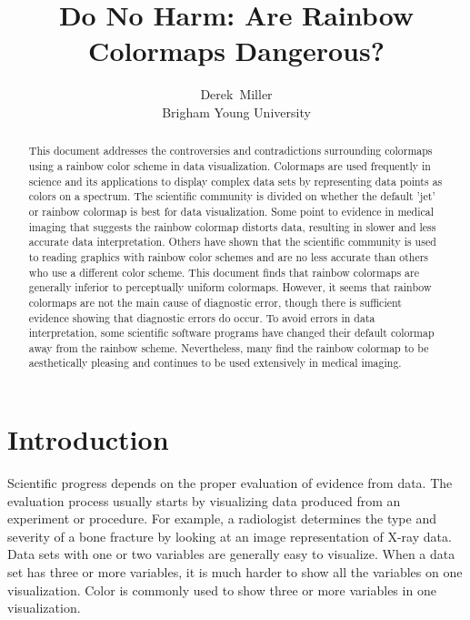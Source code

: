 \documentclass[journal,12pt]{IEEEtran}
\title{Do No Harm: Are Rainbow Colormaps Dangerous? \\}
\author{Derek~Miller \\ Brigham Young University}%
\begin{document}
\begin{titlepage}
\maketitle
\thispagestyle{empty}

\begin{abstract}
This document addresses the controversies and contradictions
surrounding colormaps using a rainbow color scheme in data visualization.
Colormaps are used frequently in science and its applications
to display complex data sets by
representing data points as colors on a spectrum. The scientific
community is divided on whether the default 'jet' or rainbow colormap
is best for data visualization. Some point to evidence in medical imaging
that suggests the rainbow colormap distorts data, resulting in slower and 
less accurate data interpretation. Others have shown that the
scientific community is used to reading graphics with rainbow
color schemes and are no less accurate than others who use
a different color scheme. This document finds that rainbow colormaps
are generally inferior to perceptually uniform colormaps. However, it
seems that rainbow colormaps are not the main cause of diagnostic error,
though there is sufficient evidence showing that diagnostic errors do occur.
To avoid errors in data interpretation, some scientific software programs
have changed their default colormap away from the rainbow scheme.
Nevertheless, many find the rainbow colormap to be aesthetically pleasing
and continues to be used extensively in medical imaging.
\end{abstract}
\tableofcontents
\vspace*{\fill}
\end{titlepage}

\IEEEpeerreviewmaketitle

\section{Introduction}
Scientific progress depends on the proper evaluation
of evidence from data. The evaluation process usually
starts by visualizing data produced from an experiment
or procedure. For example, a radiologist determines the
type and severity of a bone fracture by looking at an
image representation of X-ray data.
Data sets with one or two variables are generally easy to visualize. 
When a data set has three or more variables, it is much harder to show all the variables
on one visualization. Color is commonly used to show three or more variables in one visualization.
\end{document}
